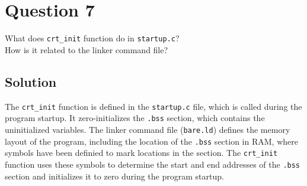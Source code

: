 \section*{Question 7}

What does \texttt{crt\_init} function do in \texttt{startup.c}? \\
How is it related to the linker command file?

\subsection*{Solution}

The \texttt{crt\_init} function is defined in the \texttt{startup.c} file, which is called during the program startup.
It zero-initializes the \texttt{.bss} section, which contains the uninitialized variables.
The linker command file (\texttt{bare.ld}) defines the memory layout of the program, including the location of the \texttt{.bss} section in RAM, where symbols have been definied to mark locations in the section.
The \texttt{crt\_init} function uses these symbols to determine the start and end addresses of the \texttt{.bss} section and initializes it to zero during the program startup.
